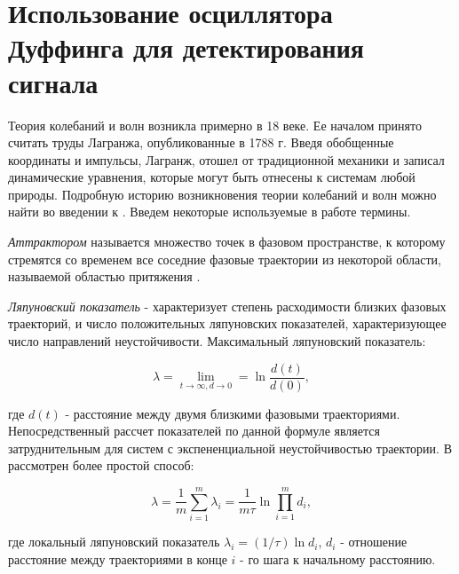 \section{Использование осциллятора Дуффинга для детектирования сигнала}
Теория колебаний и волн возникла примерно в 18 веке. Ее началом принято считать труды Лагранжа, опубликованные в 1788 г. Введя обобщенные
координаты и импульсы, Лагранж, отошел от традиционной механики и записал динамические уравнения, которые могут быть отнесены к системам
любой природы. Подробную историю возникновения теории колебаний и волн можно найти во введении к \cite{landa_book}. 
Введем некоторые используемые в работе термины.

\emph{Аттрактором} называется множество точек в фазовом пространстве, к которому стремятся со
временем все соседние фазовые траектории из некоторой области, называемой областью притяжения \cite{landa_book}.

\emph{Ляпуновский показатель} - 
характеризует степень расходимости близких фазовых траекторий, и число положительных ляпуновских показателей, характеризующее число направлений
неустойчивости. Максимальный ляпуновский показатель:
\begin{center}
\begin{equation}
	\label{eq:exp_lyapunova_1}
	\lambda = \lim \limits_{t \to \infty, d \to 0} = \ln \frac{d(t)}{d(0)},
\end{equation}
\end{center}
где ${d(t)}$ - расстояние между двумя близкими фазовыми траекториями. Непосредственный рассчет показателей по данной формуле является
затруднительным для систем с экспененциальной неустойчивостью траектории. В \cite{landa_book} рассмотрен более простой способ:
\begin{center}
\begin{equation}
	\label{eq:exp_lyapunova_2}
	\lambda = \frac{1}{m}\sum \limits_{i=1}^m \lambda_i = \frac{1}{m\tau}\ln\prod \limits_{i=1}^md_i,
\end{equation}
\end{center}
где локальный ляпуновский показатель ${\lambda_i}=(1/ \tau)\ln d_i$, ${d_i}$ - отношение расстояние между траекториями в конце ${i}$ - го
шага к начальному расстоянию.

\newpage
